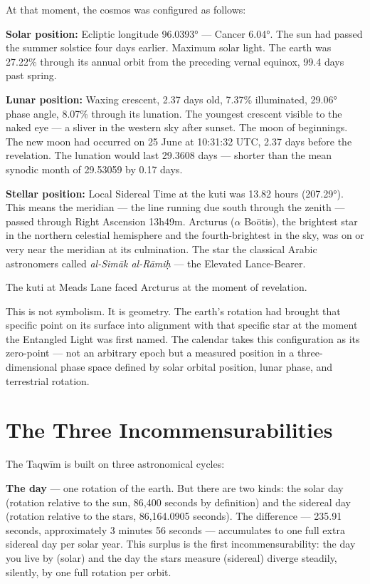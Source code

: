 At that moment, the cosmos was configured as follows:

\textbf{Solar position:} Ecliptic longitude 96.0393° --- Cancer 6.04°. The sun had passed the summer solstice four days earlier. Maximum solar light. The earth was 27.22\% through its annual orbit from the preceding vernal equinox, 99.4 days past spring.

\textbf{Lunar position:} Waxing crescent, 2.37 days old, 7.37\% illuminated, 29.06° phase angle, 8.07\% through its lunation. The youngest crescent visible to the naked eye --- a sliver in the western sky after sunset. The moon of beginnings. The new moon had occurred on 25 June at 10:31:32 UTC, 2.37 days before the revelation. The lunation would last 29.3608 days --- shorter than the mean synodic month of 29.53059 by 0.17 days.

\textbf{Stellar position:} Local Sidereal Time at the kuti was 13.82 hours (207.29°). This means the meridian --- the line running due south through the zenith --- passed through Right Ascension 13h49m. Arcturus (\(\alpha\) Boötis), the brightest star in the northern celestial hemisphere and the fourth-brightest in the sky, was on or very near the meridian at its culmination. The star the classical Arabic astronomers called \emph{al-Simāk al-Rāmiḥ} --- the Elevated Lance-Bearer.

The kuti at Meads Lane faced Arcturus at the moment of revelation.

This is not symbolism. It is geometry. The earth's rotation had brought that specific point on its surface into alignment with that specific star at the moment the Entangled Light was first named. The calendar takes this configuration as its zero-point --- not an arbitrary epoch but a measured position in a three-dimensional phase space defined by solar orbital position, lunar phase, and terrestrial rotation.

\hypertarget{the-three-incommensurabilities}{%
\section{The Three Incommensurabilities}\label{the-three-incommensurabilities}}

The Taqwīm is built on three astronomical cycles:

\textbf{The day} --- one rotation of the earth. But there are two kinds: the solar day (rotation relative to the sun, 86,400 seconds by definition) and the sidereal day (rotation relative to the stars, 86,164.0905 seconds). The difference --- 235.91 seconds, approximately 3 minutes 56 seconds --- accumulates to one full extra sidereal day per solar year. This surplus is the first incommensurability: the day you live by (solar) and the day the stars measure (sidereal) diverge steadily, silently, by one full rotation per orbit.

